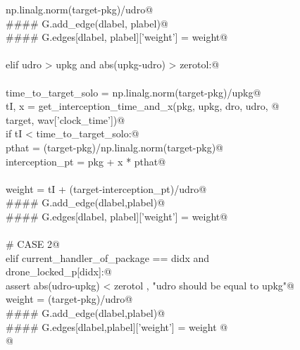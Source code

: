 \documentclass[10pt, english, oneside]{report}
\begin{document}
\begin{flushleft}
\begin{minipage}{\linewidth}
\begin{list}{}{}
\mbox{}\verb@                               np.linalg.norm(target-pkg)/udro@\\
\mbox{}\verb@                      #### G.add_edge(dlabel, plabel)@\\
\mbox{}\verb@                      #### G.edges[dlabel, plabel]['weight'] = weight@\\
\mbox{}\verb@@\\
\mbox{}\verb@                elif udro > upkg and abs(upkg-udro) > zerotol:@\\
\mbox{}\verb@@\\
\mbox{}\verb@                     time_to_target_solo = np.linalg.norm(target-pkg)/upkg@\\
\mbox{}\verb@                     tI, x = get_interception_time_and_x(pkg, upkg, dro, udro, @\\
\mbox{}\verb@                                                         target, wav['clock_time'])@\\
\mbox{}\verb@                     if tI < time_to_target_solo:@\\
\mbox{}\verb@                          pthat = (target-pkg)/np.linalg.norm(target-pkg)@\\
\mbox{}\verb@                          interception_pt = pkg + x * pthat@\\
\mbox{}\verb@@\\
\mbox{}\verb@                          weight = tI + (target-interception_pt)/udro@\\
\mbox{}\verb@                          #### G.add_edge(dlabel,plabel)@\\
\mbox{}\verb@                          #### G.edges[dlabel, plabel]['weight'] = weight@\\
\mbox{}\verb@@\\
\mbox{}\verb@        # CASE 2@\\
\mbox{}\verb@        elif current_handler_of_package == didx and \@\\
\mbox{}\verb@             drone_locked_p[didx]:@\\
\mbox{}\verb@               assert abs(udro-upkg) < zerotol , "udro should be equal to upkg"@\\
\mbox{}\verb@               weight = (target-pkg)/udro@\\
\mbox{}\verb@               #### G.add_edge(dlabel,plabel)@\\
\mbox{}\verb@               #### G.edges[dlabel,plabel]['weight'] = weight @\\
\mbox{}\verb@  @\\

\end{list}
\end{minipage}
\end{flushleft}
\end{document}

